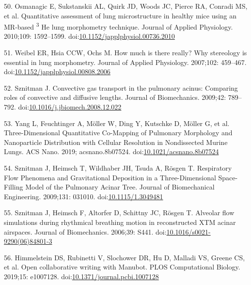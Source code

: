 \documentclass[
  american,
]{article}
\newenvironment{cslreferences}%
  {}%
  {\par}
\begin{document}
\begin{cslreferences}
\leavevmode\hypertarget{ref-LzalnLBH}{}%
50. Osmanagic E, Sukstanskii AL, Quirk JD, Woods JC, Pierce RA, Conradi MS, et al. Quantitative assessment of lung microstructure in healthy mice using an MR-based \textsuperscript{3} He lung morphometry technique. Journal of Applied Physiology. 2010;109: 1592--1599. doi:\href{https://doi.org/10.1152/japplphysiol.00736.2010}{10.1152/japplphysiol.00736.2010}

\leavevmode\hypertarget{ref-1CLJ32t5m}{}%
51. Weibel ER, Hsia CCW, Ochs M. How much is there really? Why stereology is essential in lung morphometry. Journal of Applied Physiology. 2007;102: 459--467. doi:\href{https://doi.org/10.1152/japplphysiol.00808.2006}{10.1152/japplphysiol.00808.2006}

\leavevmode\hypertarget{ref-RJ9GQcwl}{}%
52. Sznitman J. Convective gas transport in the pulmonary acinus: Comparing roles of convective and diffusive lengths. Journal of Biomechanics. 2009;42: 789--792. doi:\href{https://doi.org/10.1016/j.jbiomech.2008.12.022}{10.1016/j.jbiomech.2008.12.022}

\leavevmode\hypertarget{ref-19jBv0ima}{}%
53. Yang L, Feuchtinger A, Möller W, Ding Y, Kutschke D, Möller G, et al. Three-Dimensional Quantitative Co-Mapping of Pulmonary Morphology and Nanoparticle Distribution with Cellular Resolution in Nondissected Murine Lungs. ACS Nano. 2019; acsnano.8b07524. doi:\href{https://doi.org/10.1021/acsnano.8b07524}{10.1021/acsnano.8b07524}

\leavevmode\hypertarget{ref-afF83siN}{}%
54. Sznitman J, Heimsch T, Wildhaber JH, Tsuda A, Rösgen T. Respiratory Flow Phenomena and Gravitational Deposition in a Three-Dimensional Space-Filling Model of the Pulmonary Acinar Tree. Journal of Biomechanical Engineering. 2009;131: 031010. doi:\href{https://doi.org/10.1115/1.3049481}{10.1115/1.3049481}

\leavevmode\hypertarget{ref-k5fqLjiy}{}%
55. Sznitman J, Heimsch F, Altorfer D, Schittny JC, Rösgen T. Alveolar flow simulations during rhythmical breathing motion in reconstructed XTM acinar airspaces. Journal of Biomechanics. 2006;39: S441. doi:\href{https://doi.org/10.1016/s0021-9290(06)84801-3}{10.1016/s0021-9290(06)84801-3}

\leavevmode\hypertarget{ref-YuJbg3zO}{}%
56. Himmelstein DS, Rubinetti V, Slochower DR, Hu D, Malladi VS, Greene CS, et al. Open collaborative writing with Manubot. PLOS Computational Biology. 2019;15: e1007128. doi:\href{https://doi.org/10.1371/journal.pcbi.1007128}{10.1371/journal.pcbi.1007128}
\end{cslreferences}
\end{document}
